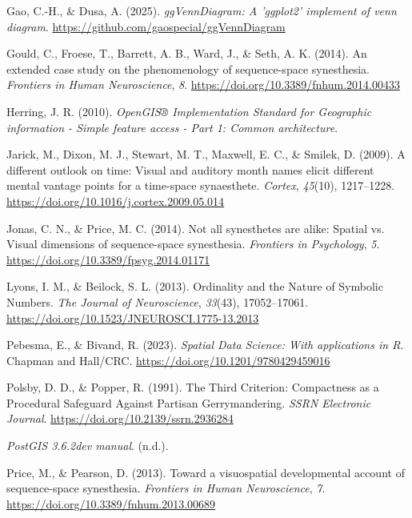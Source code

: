 \documentclass[
  man,
  longtable,
  a4paper,
  nolmodern,
  notxfonts,
  notimes,
  colorlinks=true,linkcolor=blue,citecolor=blue,urlcolor=blue]{apa7}
\newlength{\cslhangindent}
\newenvironment{CSLReferences}[2] %
 {\begin{list}{}{%
  \setlength{\itemindent}{0pt}
  \setlength{\leftmargin}{0pt}
  \setlength{\parsep}{0pt}
  \ifodd #1
   \setlength{\leftmargin}{\cslhangindent}
   \setlength{\itemindent}{-1\cslhangindent}
  \fi
  \setlength{\itemsep}{#2\baselineskip}}}
 {\end{list}}
\begin{document}
\begin{CSLReferences}{1}{0}
Gao, C.-H., \& Dusa, A. (2025). \emph{{ggVennDiagram}: A 'ggplot2'
implement of venn diagram}.
\url{https://github.com/gaospecial/ggVennDiagram}

Gould, C., Froese, T., Barrett, A. B., Ward, J., \& Seth, A. K. (2014).
An extended case study on the phenomenology of sequence-space
synesthesia. \emph{Frontiers in Human Neuroscience}, \emph{8}.
\url{https://doi.org/10.3389/fnhum.2014.00433}

Herring, J. R. (2010). \emph{OpenGIS® Implementation Standard for
Geographic information - Simple feature access - Part 1: Common
architecture}.

Jarick, M., Dixon, M. J., Stewart, M. T., Maxwell, E. C., \& Smilek, D.
(2009). A different outlook on time: Visual and auditory month names
elicit different mental vantage points for a time-space synaesthete.
\emph{Cortex}, \emph{45}(10), 1217--1228.
\url{https://doi.org/10.1016/j.cortex.2009.05.014}

Jonas, C. N., \& Price, M. C. (2014). Not all synesthetes are alike:
Spatial vs. Visual dimensions of sequence-space synesthesia.
\emph{Frontiers in Psychology}, \emph{5}.
\url{https://doi.org/10.3389/fpsyg.2014.01171}

Lyons, I. M., \& Beilock, S. L. (2013). Ordinality and the Nature of
Symbolic Numbers. \emph{The Journal of Neuroscience}, \emph{33}(43),
17052--17061. \url{https://doi.org/10.1523/JNEUROSCI.1775-13.2013}

Pebesma, E., \& Bivand, R. (2023). \emph{{Spatial Data Science: With
applications in {R}}}. {Chapman and Hall/CRC}.
\url{https://doi.org/10.1201/9780429459016}

Polsby, D. D., \& Popper, R. (1991). The Third Criterion: Compactness as
a Procedural Safeguard Against Partisan Gerrymandering. \emph{SSRN
Electronic Journal}. \url{https://doi.org/10.2139/ssrn.2936284}

\emph{PostGIS 3.6.2dev manual}. (n.d.).

Price, M., \& Pearson, D. (2013). Toward a visuospatial developmental
account of sequence-space synesthesia. \emph{Frontiers in Human
Neuroscience}, \emph{7}. \url{https://doi.org/10.3389/fnhum.2013.00689}


\end{CSLReferences}
\end{document}
